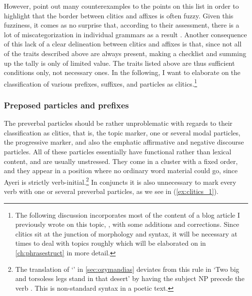 However, \citet{spencerluis2012} point out many counterexamples to the points
on this list in order to highlight that the border between clitics and affixes
is often fuzzy. Given this fuzziness, it comes as no surprise that, according to
their assessment, there is a lot of miscategorization in individual grammars as
a result \citep[107]{spencerluis2012}. Another consequence of this lack of a
clear delineation between clitics and affixes is that, since not all of the
traits described above are always present, making a checklist and summing up
the tally is only of limited value. The traits listed above are thus sufficient
conditions only, not necessary ones. In the following, I want to elaborate on
the classification of various prefixes, suffixes, and particles as
clitics.\footnote{The following discussion incorporates most of the content of
a blog article I previously wrote on this topic, \citet{benung:clitics}, with
some additions and corrections. Since clitics sit at the junction of morphology
and syntax, it will be necessary at times to deal with topics roughly which
will be elaborated on in \autoref{ch:phrasestruct} in more detail.}

\subsubsection{Preposed particles and prefixes}

\label{clitics_preverb}
The preverbal particles should be rather unproblematic 
with regards to their classification as clitics, that is,
the topic marker, one or several modal
particles, the progressive marker, and
also the emphatic affirmative and negative discourse particles. All of these particles essentially have functional rather than
lexical content, and are usually unstressed. They come in a cluster with a fixed
order, and they appear in a position where no ordinary word material could go,
since Ayeri is strictly verb-initial.\footnote{The translation of
`' in \autoref{sec:ozymandias} deviates from this
rule in 
  `Two big and torsoless legs stand in that desert' by having the
subject NP  precede the verb
. This is non-standard syntax in a poetic
text.} In conjuncts it is also unnecessary to mark every verb with one or
several preverbal particles, as we see in (\ref{ex:clitics_1}).

